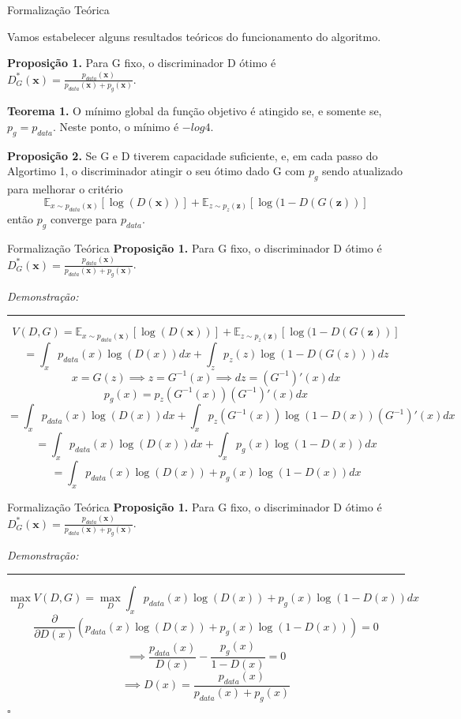 \documentclass[10pt]{beamer}
\newcommand*{\QEDB}{\hfill\ensuremath{\square}}%
\begin{document}
\begin{frame}[fragile]{Formalização Teórica}
	
	Vamos estabelecer alguns resultados teóricos do funcionamento
	do algoritmo.

	\small
	\textbf{Proposição 1.} Para G fixo, o discriminador D ótimo é
	$
	D^*_G(\bm x) = \frac{p_{data}(\bm x)}
	{p_{data}(\bm x) + p_g(\bm x)}
	$.

	\hfill
	\break
	\textbf{Teorema 1.} O mínimo global da função objetivo
	é atingido se, e somente se, $p_g = p_{data}$. Neste ponto,
	o mínimo é $-log 4$.

	\hfill
	\break
	\textbf{Proposição 2.} Se G e D tiverem capacidade suficiente,
	e, em cada passo do Algortimo 1, o discriminador atingir o seu
	ótimo dado G com $p_g$ sendo atualizado para melhorar o critério
    $$
    \mathbb{E}_{x\sim p_{data}(\bm x)}\left[\log{(D(\bm x))}\right]+
    \mathbb{E}_{z\sim p_z(\bm z)}\left[\log(1-D(G(\bm z))\right]
    $$
    então $p_g$ converge para $p_{data}$.

\end{frame}

\begin{frame}[fragile]{Formalização Teórica}
\small
	\textbf{Proposição 1.} Para G fixo, o discriminador D ótimo é
	$
	D^*_G(\bm x) = \frac{p_{data}(\bm x)}
	{p_{data}(\bm x) + p_g(\bm x)}
	$.

	\textit{Demonstração:}
	\hrule
  $$V(D,G)=
    \mathbb{E}_{x\sim p_{data}(\bm x)}\left[\log{(D(\bm x))}\right]+
    \mathbb{E}_{z\sim p_z(\bm z)}\left[\log(1-D(G(\bm z))\right]
  $$
  \pause
  $$= \int_x p_{data}(x)\log{(D(x))}dx + \int_z p_z(z)\log{(1-D(G(z)))}dz $$
  \pause
  $$x = G(z) \implies z = G^{-1}(x) \implies dz = (G^{-1})'(x)dx $$
  $$p_g(x) = p_z(G^{-1}(x))(G^{-1})'(x)dx $$
  \pause
  $$= \int_x p_{data}(x)\log{(D(x))}dx + \int_x p_z(G^{-1}(x))\log{(1-D(x))}(G^{-1})'(x)dx $$
  \pause
  $$= \int_x p_{data}(x)\log{(D(x))}dx + \int_x p_g(x)\log{(1-D(x))}dx $$
  \pause
  $$= \int_x p_{data}(x)\log{(D(x))} + p_g(x)\log{(1-D(x))}dx $$
\end{frame}

\begin{frame}[fragile]{Formalização Teórica}
\small
	\textbf{Proposição 1.} Para G fixo, o discriminador D ótimo é
	$
	D^*_G(\bm x) = \frac{p_{data}(\bm x)}
	{p_{data}(\bm x) + p_g(\bm x)}
	$.

	\textit{Demonstração:}
	\hrule
 $$\max_{D} V(D,G) = \max_{D}\int_x p_{data}(x)\log{(D(x))} + p_g(x)\log{(1-D(x))}dx $$
 \pause
 $$\frac{\partial}{\partial D(x)} \left(p_{data}(x)\log{(D(x))} + p_g(x)\log{(1-D(x))}\right) = 0 $$
 \pause
 $$\implies \dfrac{p_{data}(x)}{D(x)} - \dfrac{p_g(x)}{1 - D(x)} = 0 $$
 $$\implies D(x) = \dfrac{p_{data}(x)}{p_{data}(x)+p_g(x)} $$
 \QEDB
\end{frame}
\end{document}

